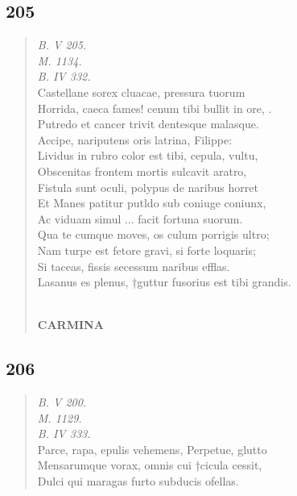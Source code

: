 \documentclass[11pt, a4paper]{report}
\begin{document}
            \subsection*{205}
      \begin{verse}
      \textit{B. V 205.} \\ \textit{M. 1134.} \\ \textit{B. IV 332.} \\ Castellane sorex cluacae, pressura tuorum \\ Horrida, caeca fames! cenum tibi bullit in ore, . \\ Putredo et cancer trivit dentesque malasque. \\ Accipe, nariputens oris latrina, Filippe: \\ Lividus in rubro color est tibi, cepula, vultu, \\ Obscenitas frontem mortis sulcavit aratro, \\ Fistula sunt oculi, polypus de naribus horret \\ Et Manes patitur putldo sub coniuge coniunx, \\ Ac viduam simul  \lbrack ... \rbrack  facit fortuna suorum. \\ Qua te cumque moves, os culum porrigis ultro; \\ Nam turpe est fetore gravi, si forte loquaris; \\ Si taceas, fissis secessum naribus efflas. \\ Lasanus es plenus, †guttur fusorius est tibi grandis. \\ 
        ﻿\pagebreak 
     \marginpar{[178]} \begin{center} \textbf{CARMINA} \end{center}
      \end{verse}
  
            \subsection*{206}
      \begin{verse}
      \textit{B. V 200.} \\ \textit{M. 1129.} \\ \textit{B. IV 333.} \\ Parce, rapa, epulis vehemens, Perpetue, glutto \\ Mensarumque vorax, omnis cui †cicula cessit, \\ Dulci qui maragas furto subducis ofellas. \\ 
      \end{verse}
  
\end{document}
